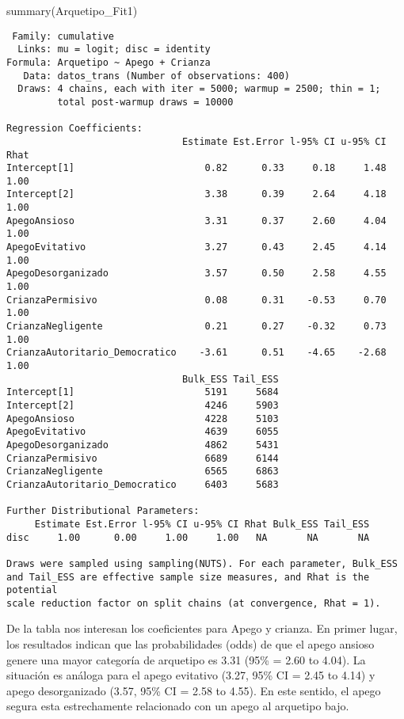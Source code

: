 \documentclass[
  letterpaper,
  DIV=11,
  numbers=noendperiod]{scrartcl}
\newenvironment{Shaded}{\begin{snugshade}}{\end{snugshade}}
\newcommand{\FunctionTok}[1]{\textcolor[rgb]{0.28,0.35,0.67}{#1}}
\newcommand{\NormalTok}[1]{\textcolor[rgb]{0.00,0.23,0.31}{#1}}
\begin{document}
\begin{Shaded}
\begin{Highlighting}[]
\FunctionTok{summary}\NormalTok{(Arquetipo\_Fit1)}
\end{Highlighting}
\end{Shaded}

\begin{verbatim}
 Family: cumulative 
  Links: mu = logit; disc = identity 
Formula: Arquetipo ~ Apego + Crianza 
   Data: datos_trans (Number of observations: 400) 
  Draws: 4 chains, each with iter = 5000; warmup = 2500; thin = 1;
         total post-warmup draws = 10000

Regression Coefficients:
                               Estimate Est.Error l-95% CI u-95% CI Rhat
Intercept[1]                       0.82      0.33     0.18     1.48 1.00
Intercept[2]                       3.38      0.39     2.64     4.18 1.00
ApegoAnsioso                       3.31      0.37     2.60     4.04 1.00
ApegoEvitativo                     3.27      0.43     2.45     4.14 1.00
ApegoDesorganizado                 3.57      0.50     2.58     4.55 1.00
CrianzaPermisivo                   0.08      0.31    -0.53     0.70 1.00
CrianzaNegligente                  0.21      0.27    -0.32     0.73 1.00
CrianzaAutoritario_Democratico    -3.61      0.51    -4.65    -2.68 1.00
                               Bulk_ESS Tail_ESS
Intercept[1]                       5191     5684
Intercept[2]                       4246     5903
ApegoAnsioso                       4228     5103
ApegoEvitativo                     4639     6055
ApegoDesorganizado                 4862     5431
CrianzaPermisivo                   6689     6144
CrianzaNegligente                  6565     6863
CrianzaAutoritario_Democratico     6403     5683

Further Distributional Parameters:
     Estimate Est.Error l-95% CI u-95% CI Rhat Bulk_ESS Tail_ESS
disc     1.00      0.00     1.00     1.00   NA       NA       NA

Draws were sampled using sampling(NUTS). For each parameter, Bulk_ESS
and Tail_ESS are effective sample size measures, and Rhat is the potential
scale reduction factor on split chains (at convergence, Rhat = 1).
\end{verbatim}

De la tabla nos interesan los coeficientes para Apego y crianza. En
primer lugar, los resultados indican que las probabilidades (odds) de
que el apego ansioso genere una mayor categoría de arquetipo es 3.31
(95\% = 2.60 to 4.04). La situación es análoga para el apego evitativo
(3.27, 95\% CI = 2.45 to 4.14) y apego desorganizado (3.57, 95\% CI =
2.58 to 4.55). En este sentido, el apego segura esta estrechamente
relacionado con un apego al arquetipo bajo.
\end{document}
